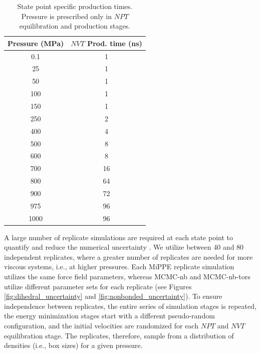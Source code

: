 \documentclass[preprint,review,12pt]{elsarticle}
\begin{document}
	\begin{table}[htb!]
		\caption{State point specific production times. Pressure is prescribed only in $NPT$ equilibration and production stages.} \label{tab:production times}
		\begin{center}
			\begin{tabular}{|c|c|}
				\hline
				Pressure (MPa) & $NVT$ Prod. time (ns) \\ \hline
				0.1 & 1 \\
				25 & 1 \\
				50 & 1 \\
				100 & 1 \\			     
				150 & 1 \\
				250 & 2 \\
				400 & 4 \\
				500 & 8 \\
				600 & 8 \\			     
				700 & 16 \\
				800 & 64 \\
				900 & 72 \\
				975 & 96 \\
				1000 & 96 \\
				\hline        
			\end{tabular}
		\end{center}
	\end{table}
	
	A large number of replicate simulations are required at each state point to quantify and reduce the numerical uncertainty \cite{Maginn2018,Zhang2015}. We utilize between 40 and 80 independent replicates, where a greater number of replicates are needed for more viscous systems, i.e., at higher pressures. Each MiPPE replicate simulation utilizes the same force field parameters, whereas MCMC-nb and MCMC-nb-tors utilize different parameter sets for each replicate (see Figures \ref{fig:dihedral_uncertainty} and \ref{fig:nonbonded_uncertainty}). To ensure independence between replicates, the entire series of simulation stages is repeated, the energy minimization stages start with a different pseudo-random configuration, and the initial velocities are randomized for each $NPT$ and $NVT$ equilibration stage. The replicates, therefore, sample from a distribution of densities (i.e., box sizes) for a given pressure. 
	
	
	
\end{document}
